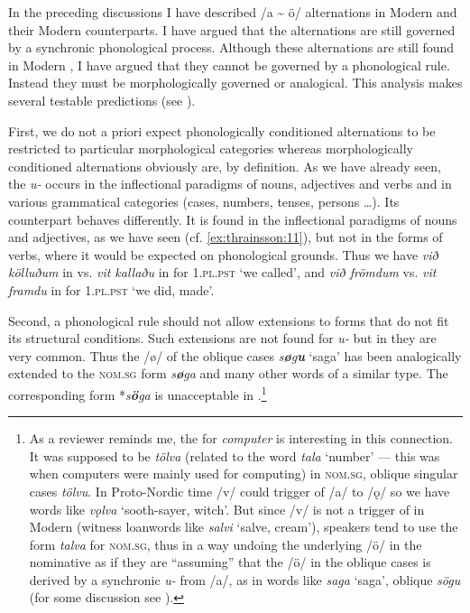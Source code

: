 \documentclass[output=paper,
modfonts
]{LSP/langsci}
\begin{document}
\begin{exe}
In the preceding discussions I have described /a
\textasciitilde{} ö/ alternations in Modern  and their Modern
 counterparts. I have argued that the  alternations are
still governed by a synchronic phonological process. Although these
alternations are still found in Modern , I have argued that they
cannot be governed by a phonological rule. Instead they must be
morphologically governed or analogical. This analysis makes several
testable predictions (see \citealt[100--102]{thrainsson2011}).

First, we do not a priori expect phonologically
conditioned alternations to be restricted to particular morphological
categories whereas morphologically conditioned alternations obviously
are, by definition. As we have already seen, the 
\emph{u-} occurs in the inflectional paradigms of nouns,
adjectives and verbs and in various grammatical categories (cases,
numbers, tenses, persons \ldots{}). Its  counterpart behaves
differently. It is found in the inflectional paradigms of nouns and
adjectives, as we have seen (cf. \ref{ex:thrainsson:11}), but not in the  forms
of verbs, where it would be expected on phonological grounds. Thus we
have \emph{við kölluðum} in  vs. \emph{vit kallaðu} in 
for \textsc{1.pl.pst} `we called', and \emph{við frömdum} vs. \emph{vit
framdu} in  for \textsc{1.pl.pst} `we did,
made'.

Second, a phonological rule should not allow  extensions to
forms that do not fit its structural conditions. Such extensions are not
found for  \emph{u-} but in  they are very common.
Thus the /ø/ of the oblique cases \emph{s\textbf{ø}g\textbf{u}} `saga'
has been analogically extended to the \textsc{nom.sg} form
\emph{s\textbf{ø}ga} and many other words of a similar type. The
corresponding form *\emph{s\textbf{ö}ga} is unacceptable in
.\footnote{As a reviewer reminds me, the  
  for \emph{computer} is interesting in this connection. It was supposed
  to be \emph{tölva} (related to the word \emph{tala} `number' --- this
  was when computers were mainly used for computing) in \textsc{nom.sg},
  oblique singular cases \emph{tölvu}. In Proto-Nordic time /v/ could
  trigger  of /a/ to /ǫ/ so we have  words like
  \emph{vǫlva} `sooth-sayer, witch'. But since /v/ is not a trigger of
   in Modern  (witness loanwords like \emph{salvi}
  `salve, cream'), speakers tend to use the form \emph{talva} for
  \textsc{nom.sg}, thus in a way undoing the underlying /ö/ in the
  nominative as if they are ``assuming'' that the /ö/ in the oblique
  cases is derived by a synchronic \emph{u-} from /a/, as in words
  like \emph{saga} `saga', oblique \emph{sögu} (for some discussion see
\citealt{thrainsson1982}).}


\end{exe}
\end{document}
